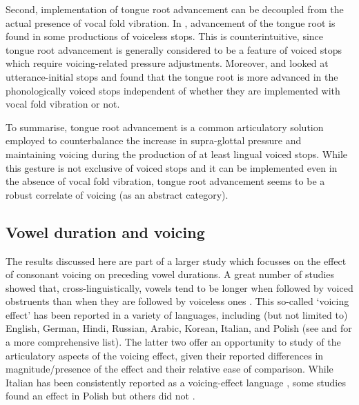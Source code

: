 \documentclass[12pt,]{article}
\begin{document}
Second, implementation of tongue root advancement can be decoupled from
the actual presence of vocal fold vibration. In \citet{westbury1983},
advancement of the tongue root is found in some productions of voiceless
stops. This is counterintuitive, since tongue root advancement is
generally considered to be a feature of voiced stops which require
voicing-related pressure adjustments. Moreover, \citet{ahn2015, ahn2018}
and \citet{ahn2016} looked at utterance-initial stops and found that the
tongue root is more advanced in the phonologically voiced stops
independent of whether they are implemented with vocal fold vibration or
not.

To summarise, tongue root advancement is a common articulatory solution
employed to counterbalance the increase in supra-glottal pressure and
maintaining voicing during the production of at least lingual voiced
stops. While this gesture is not exclusive of voiced stops and it can be
implemented even in the absence of vocal fold vibration, tongue root
advancement seems to be a robust correlate of voicing (as an abstract
category).

\hypertarget{vowel-duration-and-voicing}{%
\subsection{Vowel duration and
voicing}\label{vowel-duration-and-voicing}}

The results discussed here are part of a larger study which focusses on
the effect of consonant voicing on preceding vowel durations. A great
number of studies showed that, cross-linguistically, vowels tend to be
longer when followed by voiced obstruents than when they are followed by
voiceless ones
\citep{house1953, peterson1960, chen1970, klatt1973, lisker1974, farnetani1986, fowler1992, hussein1994, esposito2002, lampp2004, durvasula2012}.
This so-called `voicing effect' has been reported in a variety of
languages, including (but not limited to) English, German, Hindi,
Russian, Arabic, Korean, Italian, and Polish (see
\citealt{maddieson1976} and \citealt{begus2017} for a more comprehensive
list). The latter two offer an opportunity to study of the articulatory
aspects of the voicing effect, given their reported differences in
magnitude/presence of the effect and their relative ease of comparison.
While Italian has been consistently reported as a voicing-effect
language \citep{caldognetto1979, farnetani1986, esposito2002}, some
studies found an effect in Polish
\citep{slowiaczek1985, nowak2006, malisz2008, coretta2018j} but others
did not \citep{keating1984, jassem1989}.
\end{document}
